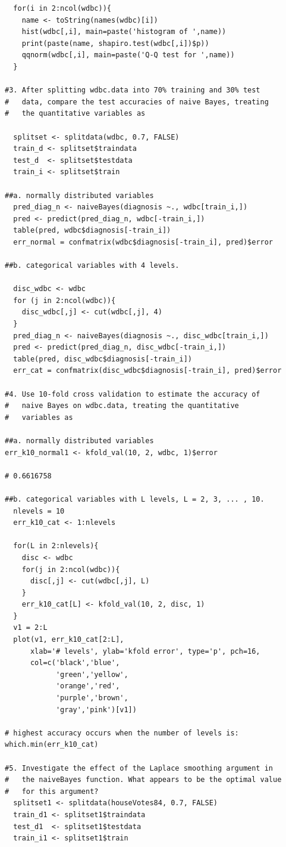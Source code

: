 \documentclass[11pt]{article}
\begin{document}
\begin{Verbatim}
  for(i in 2:ncol(wdbc)){
  	name <- toString(names(wdbc)[i])
  	hist(wdbc[,i], main=paste('histogram of ',name))
  	print(paste(name, shapiro.test(wdbc[,i])$p))
  	qqnorm(wdbc[,i], main=paste('Q-Q test for ',name))
  }

#3. After splitting wdbc.data into 70% training and 30% test 
#   data, compare the test accuracies of naive Bayes, treating 
#   the quantitative variables as 

  splitset <- splitdata(wdbc, 0.7, FALSE)
  train_d <- splitset$traindata
  test_d  <- splitset$testdata
  train_i <- splitset$train

##a. normally distributed variables
  pred_diag_n <- naiveBayes(diagnosis ~., wdbc[train_i,])
  pred <- predict(pred_diag_n, wdbc[-train_i,])
  table(pred, wdbc$diagnosis[-train_i])
  err_normal = confmatrix(wdbc$diagnosis[-train_i], pred)$error

##b. categorical variables with 4 levels. 

  disc_wdbc <- wdbc
  for (j in 2:ncol(wdbc)){
    disc_wdbc[,j] <- cut(wdbc[,j], 4)
  }
  pred_diag_n <- naiveBayes(diagnosis ~., disc_wdbc[train_i,])
  pred <- predict(pred_diag_n, disc_wdbc[-train_i,])
  table(pred, disc_wdbc$diagnosis[-train_i])
  err_cat = confmatrix(disc_wdbc$diagnosis[-train_i], pred)$error

#4. Use 10-fold cross validation to estimate the accuracy of 
#   naive Bayes on wdbc.data, treating the quantitative 
#   variables as 

##a. normally distributed variables
err_k10_normal1 <- kfold_val(10, 2, wdbc, 1)$error

# 0.6616758

##b. categorical variables with L levels, L = 2, 3, ... , 10.
  nlevels = 10
  err_k10_cat <- 1:nlevels

  for(L in 2:nlevels){
    disc <- wdbc
    for(j in 2:ncol(wdbc)){
      disc[,j] <- cut(wdbc[,j], L)
    }
    err_k10_cat[L] <- kfold_val(10, 2, disc, 1)
  }
  v1 = 2:L
  plot(v1, err_k10_cat[2:L], 
      xlab='# levels', ylab='kfold error', type='p', pch=16,
      col=c('black','blue',
            'green','yellow',
            'orange','red',
            'purple','brown',
            'gray','pink')[v1])

# highest accuracy occurs when the number of levels is: 
which.min(err_k10_cat)

#5. Investigate the effect of the Laplace smoothing argument in 
#   the naiveBayes function. What appears to be the optimal value
#   for this argument? 
  splitset1 <- splitdata(houseVotes84, 0.7, FALSE)
  train_d1 <- splitset1$traindata
  test_d1  <- splitset1$testdata
  train_i1 <- splitset1$train


\end{Verbatim}
\end{document}

